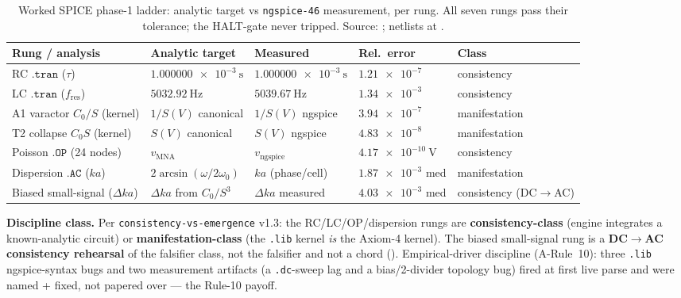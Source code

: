 \begin{table}[htbp]
\centering\footnotesize
\begin{tabular}{@{}l l l l l@{}}
\toprule
\textbf{Rung / analysis} & \textbf{Analytic target} & \textbf{Measured} & \textbf{Rel.\ error} & \textbf{Class} \\
\midrule
RC $\mathtt{.tran}$ ($\tau$) & $\qty{1.000000e-3}{\second}$ & $\qty{1.000000e-3}{\second}$ & $\num{1.21e-7}$ & consistency \\
LC $\mathtt{.tran}$ ($f_{\mathrm{res}}$) & $\qty{5032.92}{\hertz}$ & $\qty{5039.67}{\hertz}$ & $\num{1.34e-3}$ & consistency \\
A1 varactor $C_0/S$ (kernel) & $1/S(V)$ canonical & $1/S(V)$ ngspice & $\num{3.94e-7}$ & manifestation \\
T2 collapse $C_0 S$ (kernel) & $S(V)$ canonical & $S(V)$ ngspice & $\num{4.83e-8}$ & manifestation \\
Poisson $\mathtt{.OP}$ (24 nodes) & $v_{\mathrm{MNA}}$ & $v_{\mathrm{ngspice}}$ & $\qty{4.17e-10}{\volt}$ & consistency \\
Dispersion $\mathtt{.AC}$ ($ka$) & $2\arcsin(\omega/2\omega_0)$ & $ka$ (phase/cell) & $\num{1.87e-3}$ med & manifestation \\
Biased small-signal ($\Delta ka$) & $\Delta ka$ from $C_0/S^3$ & $\Delta ka$ measured & $\num{4.03e-3}$ med & consistency (DC$\to$AC) \\
\bottomrule
\end{tabular}
\caption{Worked SPICE phase-1 ladder: analytic target vs \texttt{ngspice-46} measurement, per rung. All seven rungs pass their tolerance; the HALT-gate never tripped. Source: ; netlists at .}
\label{tab:vol9_spice_ladder_summary}
\end{table}

\textbf{Discipline class.} Per \texttt{consistency-vs-emergence} v1.3: the RC/LC/OP/dispersion rungs are \textbf{consistency-class} (engine integrates a known-analytic circuit) or \textbf{manifestation-class} (the \texttt{.lib} kernel \emph{is} the Axiom-4 kernel). The biased small-signal rung is a \textbf{DC$\to$AC consistency rehearsal} of the falsifier class, not the falsifier and not a chord (). Empirical-driver discipline (A-Rule~10): three \texttt{.lib} ngspice-syntax bugs and two measurement artifacts (a \texttt{.dc}-sweep lag and a bias/2-divider topology bug) fired at first live parse and were named + fixed, not papered over --- the Rule-10 payoff.

